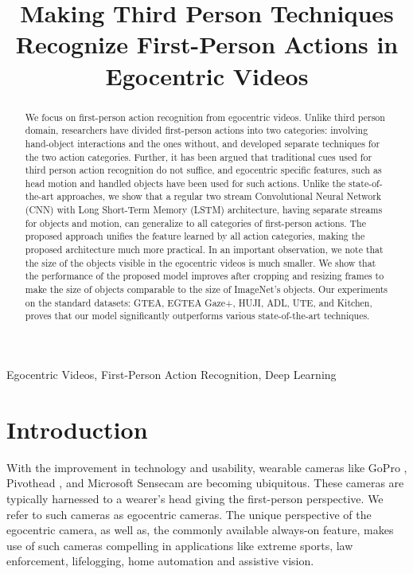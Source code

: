 \documentclass{article}
\title{Making Third Person Techniques Recognize First-Person Actions in Egocentric Videos}
\begin{document}

\maketitle
%
\begin{abstract}
We focus on first-person action recognition from egocentric videos. Unlike third person domain, researchers have divided first-person actions into two categories: involving hand-object interactions and the ones without, and developed separate techniques for the two action categories. Further, it has been argued that traditional cues used for third person action recognition do not suffice, and egocentric specific features, such as head motion and handled objects have been used for such actions. Unlike the state-of-the-art approaches, we show that a regular two stream Convolutional Neural Network (CNN) with Long Short-Term Memory (LSTM) architecture, having separate streams for objects and motion, can generalize to all categories of first-person actions. The proposed approach unifies the feature learned by all action categories, making the proposed architecture much more practical. In an important observation, we note that the size of the objects visible in the egocentric videos is much smaller. We show that the performance of the proposed model improves after cropping and resizing frames to make the size of objects comparable to the size of ImageNet's objects. Our experiments on the standard datasets: GTEA, EGTEA Gaze+, HUJI, ADL, UTE, and Kitchen, proves that our model significantly outperforms various state-of-the-art techniques.
\end{abstract}

\begin{keywords}
Egocentric Videos, First-Person Action Recognition, Deep Learning
\end{keywords}

\section{Introduction}
\label{sec:intro}

With the improvement in technology and usability, wearable cameras like GoPro \cite{GoPro}, Pivothead \cite{pivothead}, and Microsoft Sensecam \cite{sense_cam} are becoming ubiquitous. These cameras are typically harnessed to a wearer's head giving the first-person perspective. We refer to such cameras as egocentric cameras. The unique perspective of the egocentric camera, as well as, the commonly available always-on feature, makes use of such cameras compelling in applications like extreme sports, law enforcement, lifelogging, home automation and assistive vision.
\end{document}
